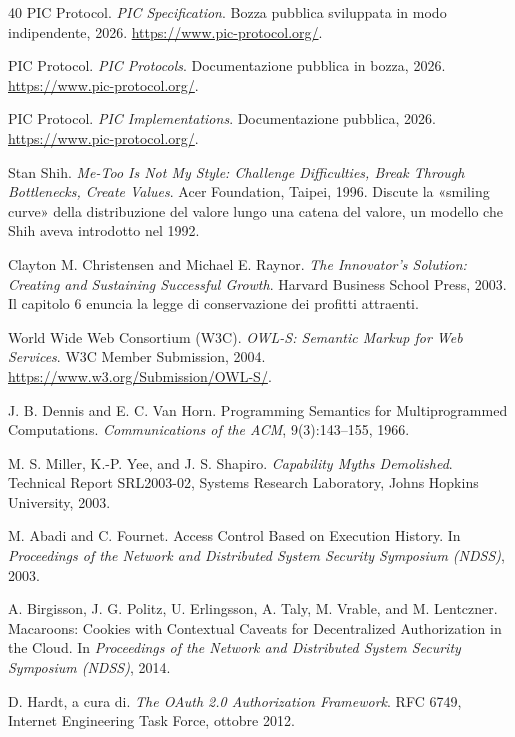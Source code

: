 \documentclass[10pt,oneside,openany]{book}
\begin{document}
\begin{thebibliography}{40}
PIC Protocol.
\newblock \emph{PIC Specification}.
\newblock Bozza pubblica sviluppata in modo indipendente, 2026. \url{https://www.pic-protocol.org/}.

PIC Protocol.
\newblock \emph{PIC Protocols}.
\newblock Documentazione pubblica in bozza, 2026. \url{https://www.pic-protocol.org/}.

PIC Protocol.
\newblock \emph{PIC Implementations}.
\newblock Documentazione pubblica, 2026. \url{https://www.pic-protocol.org/}.

Stan Shih.
\newblock \emph{Me-Too Is Not My Style: Challenge Difficulties, Break Through Bottlenecks, Create Values}.
\newblock Acer Foundation, Taipei, 1996. Discute la «smiling curve» della distribuzione del valore lungo una catena del valore, un modello che Shih aveva introdotto nel 1992.

Clayton M. Christensen and Michael E. Raynor.
\newblock \emph{The Innovator's Solution: Creating and Sustaining Successful Growth}.
\newblock Harvard Business School Press, 2003. Il capitolo 6 enuncia la legge di conservazione dei profitti attraenti.

World Wide Web Consortium (W3C).
\newblock \emph{OWL-S: Semantic Markup for Web Services}.
\newblock W3C Member Submission, 2004. \url{https://www.w3.org/Submission/OWL-S/}.

J. B. Dennis and E. C. Van Horn.
\newblock Programming Semantics for Multiprogrammed Computations.
\newblock \emph{Communications of the ACM}, 9(3):143--155, 1966.

M. S. Miller, K.-P. Yee, and J. S. Shapiro.
\newblock \emph{Capability Myths Demolished}.
\newblock Technical Report SRL2003-02, Systems Research Laboratory, Johns Hopkins University, 2003.

M. Abadi and C. Fournet.
\newblock Access Control Based on Execution History.
\newblock In \emph{Proceedings of the Network and Distributed System Security Symposium (NDSS)}, 2003.

A. Birgisson, J. G. Politz, U. Erlingsson, A. Taly, M. Vrable, and M. Lentczner.
\newblock Macaroons: Cookies with Contextual Caveats for Decentralized Authorization in the Cloud.
\newblock In \emph{Proceedings of the Network and Distributed System Security Symposium (NDSS)}, 2014.

D. Hardt, a cura di.
\newblock \emph{The OAuth 2.0 Authorization Framework}.
\newblock RFC 6749, Internet Engineering Task Force, ottobre 2012.


\end{thebibliography}
\end{document}
